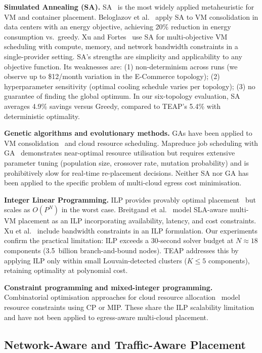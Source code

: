 \documentclass[10pt,journal]{IEEEtran}
\begin{document}
\textbf{Simulated Annealing (SA).}
SA~\cite{kirkpatrick1983} is the most widely applied metaheuristic for VM and
container placement.
Beloglazov et al.~\cite{beloglazov2012} apply SA to VM consolidation in
data centers with an energy objective, achieving 20\% reduction in energy
consumption vs.\ greedy.
Xu and Fortes~\cite{xu2010} use SA for multi-objective VM scheduling with compute,
memory, and network bandwidth constraints in a single-provider setting.
SA's strengths are simplicity and applicability to any objective function.
Its weaknesses are: (1) non-determinism across runs (we observe up to \textpm\$12/month
variation in the E-Commerce topology); (2) hyperparameter sensitivity (optimal
cooling schedule varies per topology); (3) no guarantee of finding the global
optimum.
In our six-topology evaluation, SA averages 4.9\% savings versus Greedy, compared
to TEAP's 5.4\% with deterministic optimality.

\textbf{Genetic algorithms and evolutionary methods.}
GAs have been applied to VM consolidation~\cite{beloglazov2012} and cloud resource
scheduling.
Mapreduce job scheduling with GA~\cite{xu2010} demonstrates near-optimal resource
utilisation but requires extensive parameter tuning (population size, crossover rate,
mutation probability) and is prohibitively slow for real-time re-placement decisions.
Neither SA nor GA has been applied to the specific problem of multi-cloud egress
cost minimisation.

\textbf{Integer Linear Programming.}
ILP provides provably optimal placement~\cite{breitgand2012} but scales as
$O(P^N)$ in the worst case.
Breitgand et al.~\cite{breitgand2012} model SLA-aware multi-VM placement as an
ILP incorporating availability, latency, and cost constraints.
Xu et al.~\cite{xu2010} include bandwidth constraints in an ILP formulation.
Our experiments confirm the practical limitation: ILP exceeds a 30-second
solver budget at $N \approx 18$ components (3.5~billion branch-and-bound nodes).
TEAP addresses this by applying ILP only within small Louvain-detected clusters
($K \leq 5$ components), retaining optimality at polynomial cost.

\textbf{Constraint programming and mixed-integer programming.}
Combinatorial optimisation approaches for cloud resource allocation~\cite{samaan2014}
model resource constraints using CP or MIP.
These share the ILP scalability limitation and have not been applied to egress-aware
multi-cloud placement.

\subsection{Network-Aware and Traffic-Aware Placement}
\end{document}
